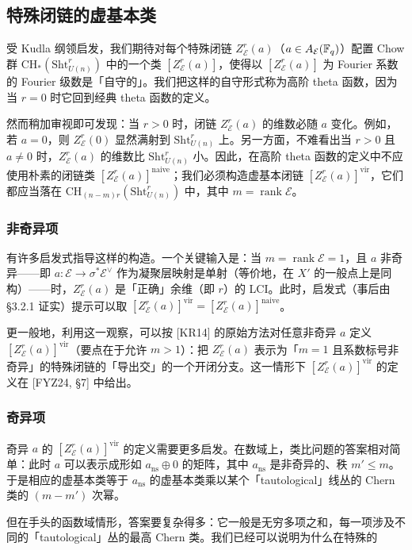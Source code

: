 \subsection{特殊闭链的虚基本类}

受 Kudla 纲领启发，我们期待对每个特殊闭链 $Z^r_{\mathcal E}(a)$（$a\in A_{\mathcal E}(\mathbb{F}_q)$）配置 Chow 群 $\mathrm{CH}_*(\mathrm{Sht}^r_{U(n)})$ 中的一个类 $[Z^r_{\mathcal E}(a)]$，使得以 $[Z^r_{\mathcal E}(a)]$ 为 Fourier 系数的 Fourier 级数是「自守的」。我们把这样的自守形式称为高阶 theta 函数，因为当 $r=0$ 时它回到经典 theta 函数的定义。

然而稍加审视即可发现：当 $r>0$ 时，闭链 $Z^r_{\mathcal E}(a)$ 的维数必随 $a$ 变化。例如，若 $a=0$，则 $Z^r_{\mathcal E}(0)$ 显然满射到 $\mathrm{Sht}^r_{U(n)}$ 上。另一方面，不难看出当 $r>0$ 且 $a\ne0$ 时，$Z^r_{\mathcal E}(a)$ 的维数比 $\mathrm{Sht}^r_{U(n)}$ 小。因此，在高阶 theta 函数的定义中不应使用朴素的闭链类 $[Z^r_{\mathcal E}(a)]^{\mathrm{naive}}$；我们必须构造虚基本闭链 $[Z^r_{\mathcal E}(a)]^{\mathrm{vir}}$，它们都应当落在 $\mathrm{CH}_{(n-m)r}(\mathrm{Sht}^r_{U(n)})$ 中，其中 $m=\operatorname{rank}\mathcal E$。

\subsubsection{非奇异项}

有许多启发式指导这样的构造。一个关键输入是：当 $m=\operatorname{rank}\mathcal E=1$，且 $a$ 非奇异——即 $a\colon\mathcal E\to\sigma^*\mathcal E^\vee$ 作为凝聚层映射是单射（等价地，在 $X'$ 的一般点上是同构）——时，$Z^r_{\mathcal E}(a)$ 是「正确」余维（即 $r$）的 LCI。此时，启发式（事后由 §3.2.1 证实）提示可以取 $[Z^r_{\mathcal E}(a)]^{\mathrm{vir}}=[Z^r_{\mathcal E}(a)]^{\mathrm{naive}}$。

更一般地，利用这一观察，可以按 [KR14] 的原始方法对任意非奇异 $a$ 定义 $[Z^r_{\mathcal E}(a)]^{\mathrm{vir}}$（要点在于允许 $m>1$）：把 $Z^r_{\mathcal E}(a)$ 表示为「$m=1$ 且系数标号非奇异」的特殊闭链的「导出交」的一个开闭分支。这一情形下 $[Z^r_{\mathcal E}(a)]^{\mathrm{vir}}$ 的定义在 [FYZ24, §7] 中给出。

\subsubsection{奇异项}

奇异 $a$ 的 $[Z^r_{\mathcal E}(a)]^{\mathrm{vir}}$ 的定义需要更多启发。在数域上，类比问题的答案相对简单：此时 $a$ 可以表示成形如 $a_{\mathrm{ns}}\oplus0$ 的矩阵，其中 $a_{\mathrm{ns}}$ 是非奇异的、秩 $m'\le m$。于是相应的虚基本类等于 $a_{\mathrm{ns}}$ 的虚基本类乘以某个「tautological」线丛的 Chern 类的 $(m-m')$ 次幂。

但在手头的函数域情形，答案要复杂得多：它一般是无穷多项之和，每一项涉及不同的「tautological」丛的最高 Chern 类。我们已经可以说明为什么在特殊的

